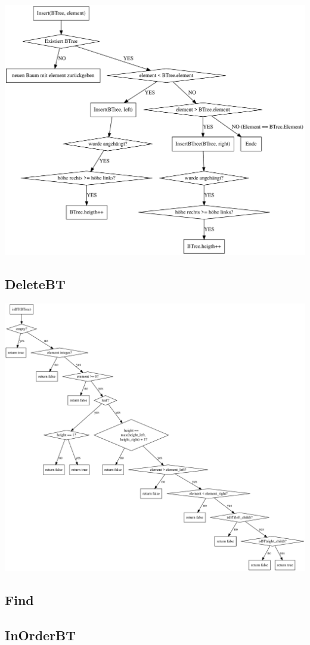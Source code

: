 \documentclass[11pt]{article}
\begin{document}
    \begin{center}
        \includegraphics[width=1.2\columnwidth] {insert}
    \end{center}

    \subsection{DeleteBT}

    \begin{center}
        \includegraphics[width=1.2\columnwidth] {delete}
    \end{center}

    \subsection{Find}

    \subsection{InOrderBT}
\end{document}
